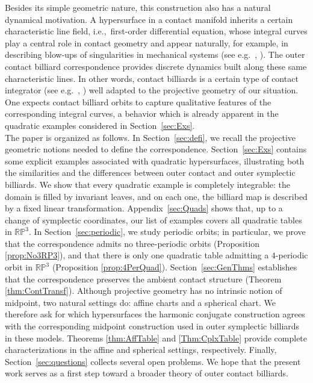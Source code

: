 \documentclass{article}
\begin{document}
Besides its simple geometric nature, this construction also has a natural dynamical 
motivation. A hypersurface in a contact manifold inherits a certain characteristic line field, i.e.,~first-order differential equation, whose integral curves play a central role in 
contact geometry and appear naturally, for example, in describing blow-ups of 
singularities in mechanical systems (see e.g.~\cite{SloanDS}, \cite{ContRed}). The outer contact billiard correspondence 
provides discrete dynamics built along these same characteristic lines. In other words, contact billiards is a certain type of contact integrator (see e.g.~\cite{DiscHerg}, \cite{ContInt}) well adapted to the projective geometry of our situation. One expects contact billiard orbits to capture qualitative features of the corresponding integral 
curves, a behavior which is already apparent in the quadratic examples considered in 
Section~\ref{sec:Exs}.\\

The paper is organized as follows. In Section~\ref{sec:defi}, we recall the projective 
geometric notions needed to define the correspondence. Section~\ref{sec:Exs} contains some 
explicit examples associated with quadratic hypersurfaces, illustrating both the 
similarities and the differences between outer contact and outer symplectic billiards. 
We show that every quadratic example is completely integrable: the domain is filled by 
invariant leaves, and on each one, the billiard map is described by a fixed linear 
transformation. Appendix~\ref{sec:Quads} shows that, up to a change of symplectic 
coordinates, our list of examples covers all quadratic tables in $\mathbb{RP}^3$. In 
Section~\ref{sec:periodic}, we study periodic orbits; in particular, we prove that the 
correspondence admits no three-periodic orbits (Proposition \ref{prop:No3RP3}), and that 
there is only one quadratic table admitting a $4$-periodic orbit in $\mathbb{RP}^3$ 
(Proposition \ref{prop:4PerQuad}). Section~\ref{sec:GenThms} establishes that the 
correspondence preserves the ambient contact structure (Theorem \ref{thm:ContTransf}). 
Although projective geometry has no intrinsic notion of midpoint, two natural settings do: 
affine charts and a spherical chart. We therefore ask for which hypersurfaces the harmonic 
conjugate construction agrees with the corresponding midpoint construction used in outer 
symplectic billiards in these models. Theorems \ref{thm:AffTable} and \ref{Thm:CplxTable} 
provide complete characterizations in the affine and spherical settings, respectively. 
Finally, Section~\ref{sec:questions} collects several open problems. We hope that the 
present work serves as a first step toward a broader theory of outer contact billiards.\\
\end{document}
